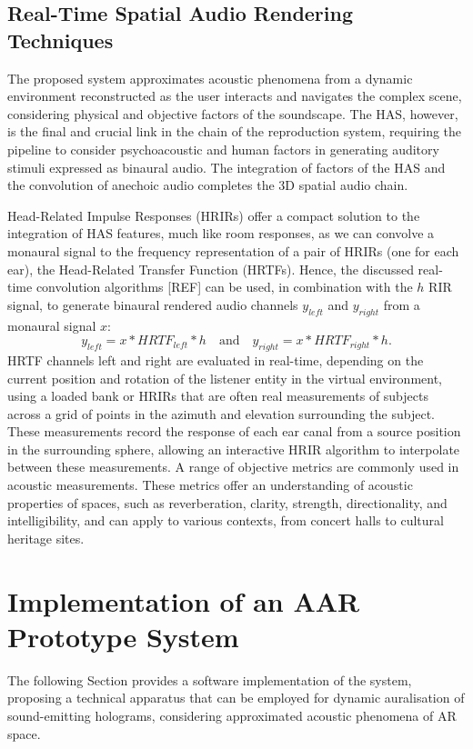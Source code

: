 \subsection{Real-Time Spatial Audio Rendering Techniques}
The proposed system approximates acoustic phenomena from a dynamic environment reconstructed as the user interacts and navigates the complex scene, considering physical and objective factors of the soundscape. The HAS, however, is the final and crucial link in the chain of the reproduction system, requiring the pipeline to consider psychoacoustic and human factors in generating auditory stimuli expressed as binaural audio. The integration of factors of the HAS and the convolution of anechoic audio completes the 3D spatial audio chain.\par
Head-Related Impulse Responses (HRIRs) offer a compact solution to the integration of HAS features, much like room responses, as we can convolve a monaural signal to the frequency representation of a pair of HRIRs (one for each ear), the Head-Related Transfer Function (HRTFs). Hence, the discussed real-time convolution algorithms [REF] can be used, in combination with the $h$ RIR signal, to generate binaural rendered audio channels $y_{left}$ and $y_{right}$ from a monaural signal $x$:
\begin{equation}
    y_{left} = x * HRTF_{left} * h \quad \textrm{and} \quad  y_{right} = x * HRTF_{right} * h \textrm{.}
\end{equation}
HRTF channels left and right are evaluated in real-time, depending on the current position and rotation of the listener entity in the virtual environment, using a loaded bank or HRIRs that are often real measurements of subjects across a grid of points in the azimuth and elevation surrounding the subject. These measurements record the response of each ear canal from a source position in the surrounding sphere, allowing an interactive HRIR algorithm to interpolate between these measurements. A range of objective metrics are commonly used in acoustic measurements. These metrics offer an understanding of acoustic properties of spaces, such as reverberation, clarity, strength, directionality, and intelligibility, and can apply to various contexts, from concert halls to cultural heritage sites. 

\section{Implementation of an AAR Prototype System}
The following Section provides a software implementation of the system, proposing a technical apparatus that can be employed for dynamic auralisation of sound-emitting holograms, considering approximated acoustic phenomena of AR space.

